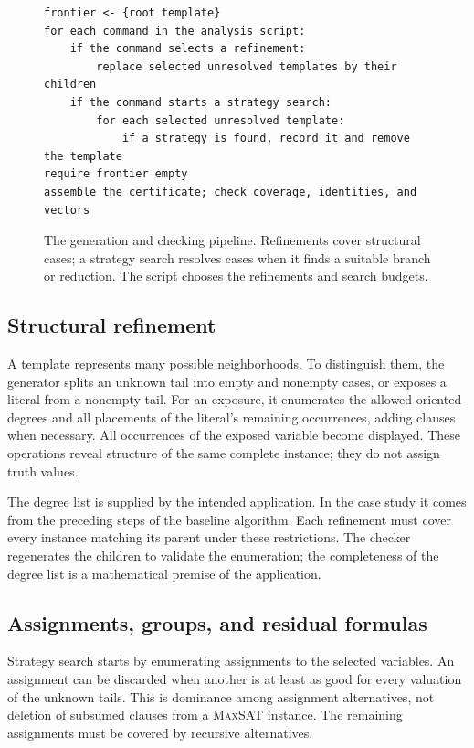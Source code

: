 \documentclass[11pt]{article}
\newcommand{\MaxSAT}{\textnormal{\textsc{MaxSAT}}}
\theoremstyle{definition}
\theoremstyle{remark}
\begin{document}
\begin{figure}[!htbp]
\centering
\begin{minipage}{0.86\linewidth}
\begin{lstlisting}
frontier <- {root template}
for each command in the analysis script:
    if the command selects a refinement:
        replace selected unresolved templates by their children
    if the command starts a strategy search:
        for each selected unresolved template:
            if a strategy is found, record it and remove the template
require frontier empty
assemble the certificate; check coverage, identities, and vectors
\end{lstlisting}
\end{minipage}
\caption{The generation and checking pipeline. Refinements cover structural
cases; a strategy search resolves cases when it finds a suitable branch or
reduction. The script chooses the refinements and search budgets.}
\label{fig:pipeline}
\end{figure}

\subsection{Structural refinement}

A template represents many possible neighborhoods. To distinguish them, the
generator splits an unknown tail into empty and nonempty cases, or exposes a
literal from a nonempty tail. For an exposure, it enumerates the allowed
oriented degrees and all placements of the literal's remaining occurrences,
adding clauses when necessary. All occurrences of the exposed variable become
displayed. These operations reveal structure of the same complete instance;
they do not assign truth values.

The degree list is supplied by the intended application. In the case study it
comes from the preceding steps of the baseline algorithm. Each refinement must
cover every instance matching its parent under these restrictions. The checker
regenerates the children to validate the enumeration; the completeness of the
degree list is a mathematical premise of the application.

\subsection{Assignments, groups, and residual formulas}
\label{sec:group-search}

Strategy search starts by enumerating assignments to the selected variables.
An assignment can be discarded when another is at least as good for every
valuation of the unknown tails. This is dominance among assignment
alternatives, not deletion of subsumed clauses from a \MaxSAT{} instance.
The remaining assignments must be covered by recursive alternatives.
\end{document}
